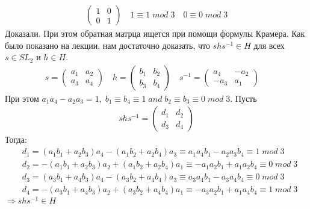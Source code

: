 \documentclass[a4paper,11pt]{article}
\begin{document}
\begin{gather*}
\begin{pmatrix}
1 & 0 \\
0 & 1
\end{pmatrix}
\quad 
1 \equiv 1 \; mod \; 3 
\quad 0 \equiv 0 \; mod \; 3
\end{gather*}
Доказали. При этом обратная матрца ищется при помощи формулы Крамера. Как было показано на лекции, нам достаточно доказать, что $ shs^{-1} \in H $ для всех $ s \in SL_2$ и $ h \in H$. 
\begin{gather*}
s = \begin{pmatrix}
a_1 & a_2 \\
a_3 & a_4
\end{pmatrix}
\quad
h =  \begin{pmatrix}
b_1 & b_2 \\
b_3 & b_4
\end{pmatrix} \quad
s^{-1} = \begin{pmatrix}
a_4 & -a_2 \\
-a_3 & a_1
\end{pmatrix} \quad 
\end{gather*}
При этом $ a_1 a_4 - a_2 a_3 = 1, \; b_1 \equiv b_4 \equiv 1 \; and \; b_2 \equiv b_3 \equiv 0 \; mod \; 3 $. Пусть 
\begin{gather*}
shs^{-1} = \begin{pmatrix}
d_1 & d_2 \\ 
d_3 & d_4
\end{pmatrix}
\end{gather*}
Тогда:
\begin{align*}
&d_1 = (a_1b_1 + a_2b_3)a_4 - (a_1b_2 + a_2b_4)a_3 \equiv a_1a_4b_1 - a_2a_3b_4 \equiv 1 \; mod \; 3 \\
&d_2 = -(a_1b_1 + a_2b_3)a_2 + (a_1b_2 + a_2b_4)a_1 \equiv -a_1a_2b_1 + a_1a_2b_4 \equiv 0 \; mod \; 3 \\
&d_3 = (a_3b_1 + a_4b_3)a_4 - (a_3b_2 + a_4b_4)a_3 \equiv a_3a_4b_1 - a_3a_4b_4 \equiv 0 \; mod \; 3 \\
&d_4 = -(a_3b_1 + a_4b_3)a_2 + (a_3b_2 + a_4b_4)a_1 \equiv -a_3a_2b_1 + a_1a_4b_4 \equiv 1 \; mod \; 3 
\end{align*}
$ \Rightarrow shs^{-1} \in H $ \newpage



\end{document}
